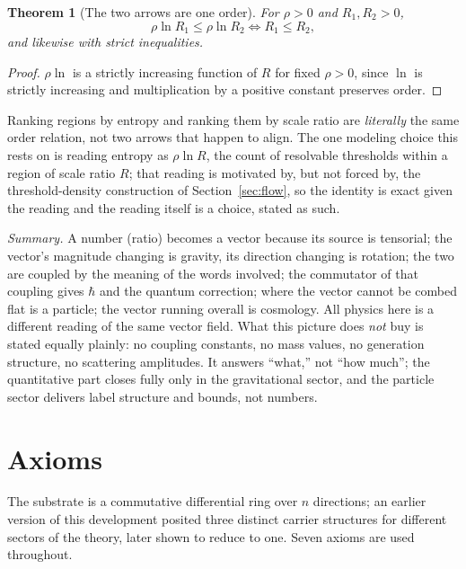 \documentclass[aps,prd,twocolumn,superscriptaddress,nofootinbib]{revtex4-2}
\newtheorem{theorem}{Theorem}
\begin{document}
\begin{theorem}[The two arrows are one order]\label{thm:onearrow}
For $\rho>0$ and $R_1,R_2>0$,
\[
\rho\ln R_1 \le \rho\ln R_2 \iff R_1\le R_2,
\]
and likewise with strict inequalities.
\end{theorem}
\begin{proof}
$\rho \ln$ is a strictly increasing function of $R$ for fixed $\rho > 0$,
since $\ln$ is strictly increasing and multiplication by a positive
constant preserves order.
\end{proof}

Ranking regions by entropy and ranking them by scale ratio are
\emph{literally} the same order relation, not two arrows that happen to
align. The one modeling choice this rests on is reading entropy as
$\rho \ln R$, the count of resolvable thresholds within a region of scale
ratio $R$; that reading is motivated by, but not forced by, the
threshold-density construction of Section~\ref{sec:flow}, so the identity
is exact given the reading and the reading itself is a choice, stated as
such.

\emph{Summary.} A number (ratio) becomes a vector because its source is
tensorial; the vector's magnitude changing is gravity, its direction
changing is rotation; the two are coupled by the meaning of the words
involved; the commutator of that coupling gives $\hbar$ and the quantum
correction; where the vector cannot be combed flat is a particle; the
vector running overall is cosmology. All physics here is a different
reading of the same vector field. What this picture does \emph{not} buy
is stated equally plainly: no coupling constants, no mass values, no
generation structure, no scattering amplitudes. It answers ``what,'' not
``how much''; the quantitative part closes fully only in the
gravitational sector, and the particle sector delivers label structure
and bounds, not numbers.

\section{Axioms}\label{sec:axioms}

The substrate is a commutative differential ring over $n$ directions; an
earlier version of this development posited three distinct carrier
structures for different sectors of the theory, later shown to reduce to
one. Seven axioms are used throughout.
\end{document}
